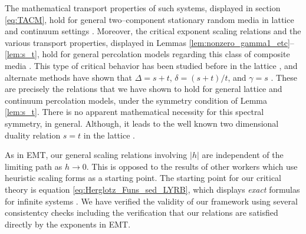 \documentclass[english,12pt,jmp,graphicx]{revtex4-1}
\begin{document}
The mathematical transport properties of such systems, displayed in
section \ref{eq:TACM}, hold for general two--component stationary
random media in lattice and continuum settings
\cite{Golden:CMP-473}. Moreover, the critical exponent scaling
relations and the various transport properties, displayed in Lemmas
\ref{lem:nonzero_gamma1_etc}--\ref{lem:s_t}, hold for general
percolation models regarding this class of composite media
\cite{Golden:PRL-3935}. This  type of critical behavior has been
studied before in the lattice 
\cite{Efros:PSSB-303,Clerc:AP-191,Bergman:SSP-147}, and alternate 
methods have shown that $\Delta=s+t$, $\delta=(s+t)/t$, and $\gamma=s$
\cite{Golden:PRL-3935}. These are precisely the relations that we have 
shown to hold for general lattice and continuum percolation models,
under the symmetry condition of Lemma \ref{lem:s_t}. There is no
apparent mathematical necessity for this spectral symmetry, in
general. Although, it leads to the well known two dimensional duality
relation $s=t$ in the lattice
\cite{Bergman:SSP-147,Clerc:AP-191,Efros:PSSB-303}. 

As in EMT, our general scaling relations involving $|h|$ are
independent of the limiting path as $h\to0$. This is opposed to the
results of other workers
\cite{Efros:PSSB-303,Clerc:AP-191,Bergman:SSP-147} which use heuristic
scaling forms as a starting point. The starting point for our critical
theory is equation \eqref{eq:Herglotz_Funs_sed_LYRB}, which displays
\emph{exact} formulas for infinite systems \cite{Golden:PRL-3935}. We
have verified the validity of our framework using several consistentcy
checks including the verification that our relations are satisfied directly
by the exponents in EMT.

\end{document}
